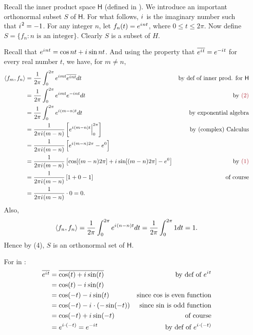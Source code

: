 \begin{example} \label{example 6.1.9}
Recall the inner product space \(\textsf{H}\) (defined in ).
We introduce an important orthonormal subset \(S\) of \(\textsf{H}\).
For what follows, \({i\mkern1mu}\) is the imaginary number such that \({i\mkern1mu}^2 = -1\).
For any integer \(n\), let \(f_n(t) = e^{{i\mkern1mu} n t}\), where \(0 \le t \le 2 \pi\).
Now define \(S = \{ f_n : n \text{ is an integer} \}\).
Clearly \(S\) is a subset of \(H\).

Recall that \(e^{{i\mkern1mu} nt} = \cos nt + {i\mkern1mu} \sin nt\). 
And using the property that \(\overline{e^{{i\mkern1mu} t}} = e^{-{i\mkern1mu} t}\) \RED{*} for every real number \(t\), we have, for \(m \ne n\),
\begin{align*}
    \LG f_m, f_n \RG & = \frac{1}{2\pi} \int_0^{2\pi} e^{\iu m t} \conjugatet{e^{\iu n t}} dt & \text{by def of inner prod. for \(\textsf{H}\)} \\
        & = \frac{1}{2\pi} \int_0^{2\pi} e^{\iu m t} e^{-\iu n t} dt & \text{by \MAROON{(2)}} \\
        & = \frac{1}{2\pi} \int_0^{2\pi} e^{\iu (m - n) t} dt & \text{by exponential algebra} \\
        & = \frac{1}{2\pi \iu(m - n)} \left[ e^{\iu(m - n)t} \Big|_0^{2\pi} \right] & \text{by (complex) Calculus} \\
        & = \frac{1}{2\pi \iu(m - n)} \left[ e^{\iu(m - n)2\pi} - e^0 \right] \\
        & = \frac{1}{2\pi \iu(m - n)} \left[ \cos[(m - n)2\pi] + \iu \sin[(m - n)2\pi] - e^0 \right] & \text{by \MAROON{(1)}} \\
        & = \frac{1}{2\pi \iu(m - n)} \left[ 1 + 0 - 1 \right] & \text{of course} \\
        & = \frac{1}{2\pi \iu(m - n)} \cdot 0 = 0.
\end{align*}
Also,
\[
    \left< f_n, f_n \right> = \frac{1}{2\pi} \int_0^{2\pi} e^{{i\mkern1mu}(n - n)t} dt = \frac{1}{2\pi} \int_0^{2\pi} 1 dt = 1. 
\]
Hence by (4), \(S\) is an orthonormal set of \(\textsf{H}\).
\end{example}

\begin{note}
For \RED{*} in :
\begin{align*}
    \overline{e^{{i\mkern1mu} t}} & = \overline{\cos(t) + {i\mkern1mu} \sin(t)} & \text{by def of \(e^{{i\mkern1mu}t}\)} \\
        & = \cos(t) - {i\mkern1mu} \sin(t) \\
        & = \cos(-t) - {i\mkern1mu} \sin(t) & \text{since \(\cos\) is even function} \\
        & = \cos(-t) - {i\mkern1mu} \cdot (-\sin(-t)) & \text{since \(\sin\) is odd function} \\
        & = \cos(-t) + {i\mkern1mu} \sin(-t) & \text{of course} \\
        & = e^{{i\mkern1mu} \cdot (-t)} = e^{-{i\mkern1mu} t} & \text{by def of \(e^{{i\mkern1mu}\cdot (-t)}\)}
\end{align*}
\end{note}
